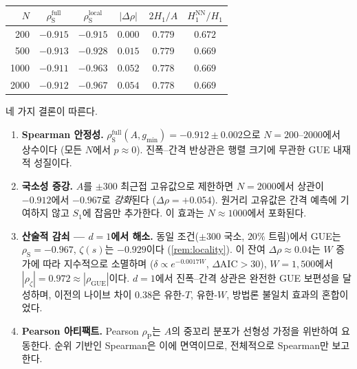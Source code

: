 \documentclass[11pt,a4paper]{article}
\theoremstyle{plain}
\theoremstyle{definition}
\DeclareMathOperator{\GUE}{GUE}
\begin{document}
\begin{center}
\begin{tabular}{rccccc}
\toprule
$N$ & $\rho_{\mathrm{S}}^{\text{full}}$ & $\rho_{\mathrm{S}}^{\text{local}}$
    & $|\Delta\rho|$ & $2H_1/A$ & $H_1^{\mathrm{NN}}/H_1$ \\
\midrule
200  & $-0.915$ & $-0.915$ & $0.000$ & $0.779$ & $0.672$ \\
500  & $-0.913$ & $-0.928$ & $0.015$ & $0.779$ & $0.669$ \\
1000 & $-0.911$ & $-0.963$ & $0.052$ & $0.778$ & $0.669$ \\
2000 & $-0.912$ & $-0.967$ & $0.054$ & $0.778$ & $0.669$ \\
\bottomrule
\end{tabular}
\end{center}

네 가지 결론이 따른다.

\begin{enumerate}
  \item \textbf{Spearman 안정성.}\;
        $\rho_{\mathrm{S}}^{\text{full}}(A,g_{\min}) = -0.912 \pm 0.002$으로
        $N = 200$--$2000$에서 상수이다 (모든 $N$에서 $p \approx 0$).
        진폭--간격 반상관은 행렬 크기에 무관한 GUE 내재적 성질이다.
  \item \textbf{국소성 증강.}\;
        $A$를 $\pm 300$ 최근접 고유값으로 제한하면
        $N = 2000$에서 상관이 $-0.912$에서 $-0.967$로 \emph{강화}된다
        ($\Delta\rho = +0.054$). 원거리 고유값은 간격 예측에 기여하지 않고
        $S_1$에 잡음만 추가한다. 이 효과는 $N \approx 1000$에서 포화된다.
  \item \textbf{산술적 감쇠 --- $d\!=\!1$에서 해소.}\;
        동일 조건($\pm 300$ 국소, $20\%$ 트림)에서
        GUE는 $\rho_{\mathrm{S}} = -0.967$, $\zeta(s)$는 $-0.929$이다
        (\cref{rem:locality}).
        이 잔여 $\Delta\rho \approx 0.04$는 $W$ 증가에 따라 지수적으로 소멸하며
        ($\delta \propto e^{-0.0017W}$, $\Delta\mathrm{AIC} > 30$),
        $W = 1{,}500$에서 $|\rho_\zeta| = 0.972 \approx |\rho_{\GUE}|$이다.
        $d = 1$에서 진폭--간격 상관은 완전한 GUE 보편성을 달성하며,
        이전의 나이브 차이 $0.38$은 유한-$T$, 유한-$W$, 방법론 불일치 효과의
        혼합이었다.
  \item \textbf{Pearson 아티팩트.}\;
        Pearson $\rho_{\mathrm{P}}$는 $A$의 중꼬리 분포가
        선형성 가정을 위반하여 요동한다.
        순위 기반인 Spearman은 이에 면역이므로, 전체적으로 Spearman만 보고한다.
\end{enumerate}
\end{document}
